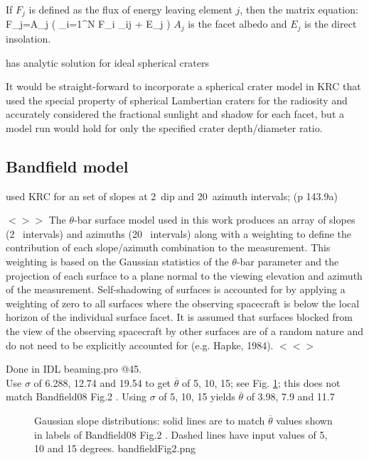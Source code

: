 \documentclass{article}
\newcommand{\bq}{$ < \! > \!   \! >$ } %
\newcommand{\eq}{ $< \! \! < \! > $ } %
\begin{document}
If $F_j$ is defined as the flux of energy leaving element $j$, then the matrix equation:
\qb F_j=A_j \left( \sum_{i=1}^N F_i \alpha_{ij} + E_j \right) \qe
$A_j$ is the facet albedo and $E_j$ is the direct insolation.

 has analytic solution for ideal spherical craters

It would be straight-forward to incorporate a spherical crater model in KRC that
used the special property of spherical Lambertian craters for the radiosity and
accurately considered the fractional sunlight and shadow for each facet, but a
model run would hold for only the specified crater depth/diameter ratio.

\subsection{Bandfield model}

 used KRC for an set of slopes at 2\qd ~dip and 20\qd ~azimuth intervals; (p 143.9a)

\bq The $\theta$-bar surface model used in this work produces an array of slopes
(2\qd~ intervals) and azimuths (20\qd~ intervals) along with a weighting to
define the contribution of each slope/azimuth combination to the
measurement. This weighting is based on the Gaussian statistics of the
$\theta$-bar parameter and the projection of each surface to a plane normal to
the viewing elevation and azimuth of the measurement. Self-shadowing of surfaces
is accounted for by applying a weighting of zero to all surfaces where the
observing spacecraft is below the local horizon of the individual surface
facet. It is assumed that surfaces blocked from the view of the observing
spacecraft by other surfaces are of a random nature and do not need to be
explicitly accounted for (e.g. Hapke, 1984). \eq

Done in IDL beaming.pro @45. \\ Use $\sigma$ of 6.288, 12.74 and 19.54 to get
$\overline{\theta}$ of 5, 10, 15; see Fig. \ref{bandfieldFig2}; this does not
match Bandfield08 Fig.2 .  Using $\sigma$ of 5, 10, 15 yields
$\overline{\theta}$ of 3.98, 7.9 and 11.7

\begin{figure}[!ht] 
\caption[Gaussian slopes ]{Gaussian slope distributions: solid lines are to
  match $\overline{\theta}$ values shown in labels of Bandfield08 Fig.2 . Dashed
  lines have input values of 5, 10 and 15 degrees.
\label{bandfieldFig2} bandfieldFig2.png  }
\end{figure} 
\end{document}
